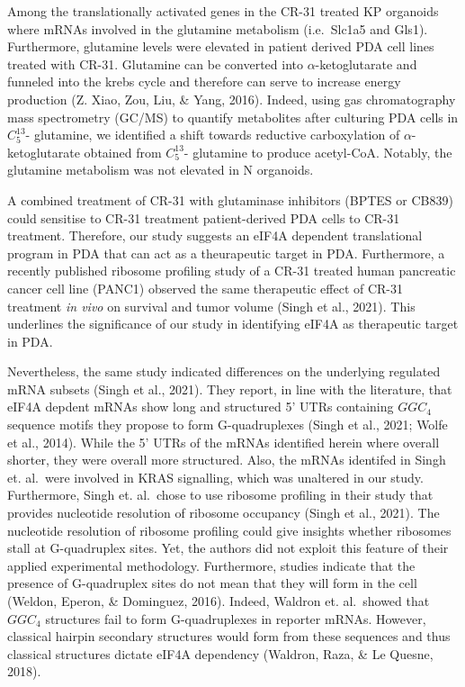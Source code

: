 \documentclass[
  12pt,
  openany]{book}
\begin{document}
Among the translationally activated genes in the CR-31 treated KP organoids where mRNAs involved in the glutamine metabolism (i.e.~Slc1a5 and Gls1). Furthermore, glutamine levels were elevated in patient derived PDA cell lines treated with CR-31. Glutamine can be converted into \(\alpha\)-ketoglutarate and funneled into the krebs cycle and therefore can serve to increase energy production (Z. Xiao, Zou, Liu, \& Yang, 2016). Indeed, using gas chromatography mass spectrometry (GC/MS) to quantify metabolites after culturing PDA cells in \(C_5^{13}\)- glutamine, we identified a shift towards reductive carboxylation of \(\alpha\)-ketoglutarate obtained from \(C_5^{13}\)- glutamine to produce acetyl-CoA. Notably, the glutamine metabolism was not elevated in N organoids.

A combined treatment of CR-31 with glutaminase inhibitors (BPTES or CB839) could sensitise to CR-31 treatment patient-derived PDA cells to CR-31 treatment. Therefore, our study suggests an eIF4A dependent translational program in PDA that can act as a theurapeutic target in PDA. Furthermore, a recently published ribosome profiling study of a CR-31 treated human pancreatic cancer cell line (PANC1) observed the same therapeutic effect of CR-31 treatment \emph{in vivo} on survival and tumor volume (Singh et al., 2021). This underlines the significance of our study in identifying eIF4A as therapeutic target in PDA.

Nevertheless, the same study indicated differences on the underlying regulated mRNA subsets (Singh et al., 2021). They report, in line with the literature, that eIF4A depdent mRNAs show long and structured 5' UTRs containing \(GGC_4\) sequence motifs they propose to form G-quadruplexes (Singh et al., 2021; Wolfe et al., 2014). While the 5' UTRs of the mRNAs identified herein where overall shorter, they were overall more structured. Also, the mRNAs identifed in Singh et. al.~were involved in KRAS signalling, which was unaltered in our study. Furthermore, Singh et. al.~chose to use ribosome profiling in their study that provides nucleotide resolution of ribosome occupancy (Singh et al., 2021). The nucleotide resolution of ribosome profiling could give insights whether ribosomes stall at G-quadruplex sites. Yet, the authors did not exploit this feature of their applied experimental methodology. Furthermore, studies indicate that the presence of G-quadruplex sites do not mean that they will form in the cell (Weldon, Eperon, \& Dominguez, 2016). Indeed, Waldron et. al.~showed that \(GGC_4\) structures fail to form G-quadruplexes in reporter mRNAs. However, classical hairpin secondary structures would form from these sequences and thus classical structures dictate eIF4A dependency (Waldron, Raza, \& Le Quesne, 2018).
\end{document}
